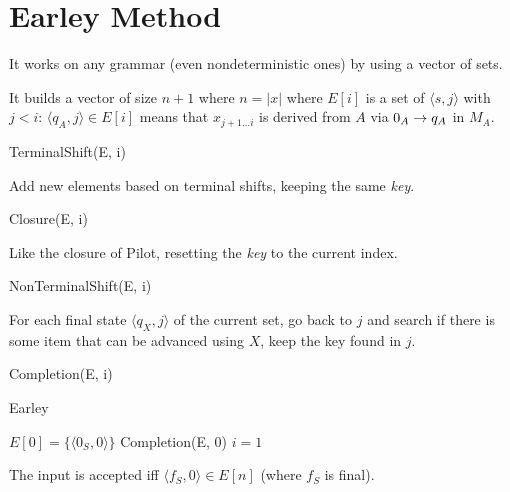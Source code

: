 \newpage

\section{Earley Method}

It works on any grammar (even nondeterministic ones) by using a vector of sets.

It builds a vector of size $n+1$ where $n=|x|$ where $E[i]$ is a set of $\langle s,j \rangle$ with $j<i$: $\langle q_A,j \rangle \in E[i]$ means that $x_{j+1\ldots i}$ is derived from $A$ via $0_A\rightarrow q_A$ in $M_A$.

\begin{algorithm*}[H]
    \caption{TerminalShift(E, i)}
    \SetAlgoLined
\end{algorithm*}
Add new elements based on terminal shifts, keeping the same \emph{key}.

\begin{algorithm*}[H]
    \caption{Closure(E, i)}
    \SetAlgoLined
\end{algorithm*}
Like the closure of Pilot, resetting the \emph{key} to the current index.

\begin{algorithm*}[H]
    \caption{NonTerminalShift(E, i)}
    \SetAlgoLined
\end{algorithm*}
For each final state $\langle q_X,j \rangle$ of the current set, go back to $j$ and search if there is some item that can be advanced using $X$, keep the key found in $j$.

\begin{algorithm*}[H]
    \caption{Completion(E, i)}
    \SetAlgoLined
\end{algorithm*}

\begin{algorithm*}[H]
    \caption{Earley}
    \SetAlgoLined
    $E[0] = \{\langle 0_S, 0 \rangle \}$\;
    Completion(E, 0)\;
    $i = 1$\;
\end{algorithm*}

The input is accepted iff $\langle f_S, 0 \rangle \in E[n]$ (where $f_S$ is final).
